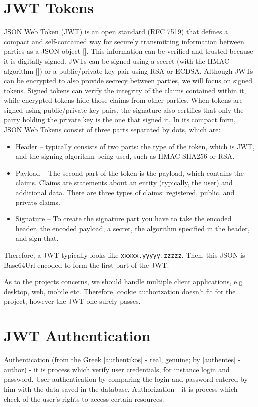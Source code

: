 \section{JWT Tokens}\label{sec:jwt-tokens}
JSON Web Token (JWT) is an open standard (RFC 7519) that defines a compact and self-contained way for securely
transmitting information between parties as a JSON object [\cite{jones2015json}].
This information can be verified and trusted because it is digitally signed.
JWTs can be signed using a secret (with the HMAC algorithm [\cite{wang2004hmac}]) or a public/private key pair using RSA or ECDSA\@.
Although JWTs can be encrypted to also provide secrecy between parties, we will focus on signed tokens.
Signed tokens can verify the integrity of the claims contained within it, while encrypted tokens hide those claims from
other parties.
When tokens are signed using public/private key pairs, the signature also certifies that only the party holding the
private key is the one that signed it.
In its compact form, JSON Web Tokens consist of three parts separated by dots, which are:
\begin{itemize}
    \item Header -- typically consists of two parts: the type of the token, which is JWT, and the signing algorithm
    being used, such as HMAC SHA256 or RSA\@.
    \item Payload -- The second part of the token is the payload, which contains the claims.
    Claims are statements about an entity (typically, the user) and additional data.
    There are three types of claims: registered, public, and private claims.
    \item Signature -- To create the signature part you have to take the encoded header, the encoded payload, a secret,
    the algorithm specified in the header, and sign that.
\end{itemize}
Therefore, a JWT typically looks like \texttt{xxxxx.yyyyy.zzzzz}.
Then, this JSON is Base64Url encoded to form the first part of the JWT\@.

As to the projects concerns, we should handle multiple client applications, e.g desktop,
web, mobile etc.
Therefore, cookie authorization doesn't fit for the project, however the JWT one surely passes.


\section{JWT Authentication}\label{sec:jwt-authentication}
Authentication (from the Greek [authentikos] - real, genuine;
by [authentes] - author) - it is process which verify user credentials, for instance login and password.
User authentication by comparing the login and password entered by him with the data saved in the database.
Authorization - it is process which check of the user's rights to access certain resources.

